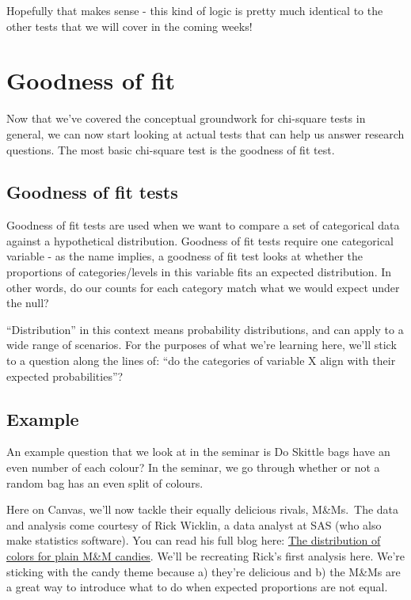 \documentclass[
]{book}
\begin{document}
Hopefully that makes sense - this kind of logic is pretty much identical to the other tests that we will cover in the coming weeks!

\hypertarget{goodness-of-fit}{%
\section{Goodness of fit}\label{goodness-of-fit}}

Now that we've covered the conceptual groundwork for chi-square tests in general, we can now start looking at actual tests that can help us answer research questions. The most basic chi-square test is the goodness of fit test.

\hypertarget{goodness-of-fit-tests}{%
\subsection{Goodness of fit tests}\label{goodness-of-fit-tests}}

Goodness of fit tests are used when we want to compare a set of categorical data against a hypothetical distribution. Goodness of fit tests require one categorical variable - as the name implies, a goodness of fit test looks at whether the proportions of categories/levels in this variable fits an expected distribution. In other words, do our counts for each category match what we would expect under the null?

``Distribution'' in this context means probability distributions, and can apply to a wide range of scenarios. For the purposes of what we're learning here, we'll stick to a question along the lines of: ``do the categories of variable X align with their expected probabilities''?

\hypertarget{example}{%
\subsection{Example}\label{example}}

An example question that we look at in the seminar is Do Skittle bags have an even number of each colour? In the seminar, we go through whether or not a random bag has an even split of colours.

Here on Canvas, we'll now tackle their equally delicious rivals, M\&Ms.~The data and analysis come courtesy of Rick Wicklin, a data analyst at SAS (who also make statistics software). You can read his full blog here: \href{https://blogs.sas.com/content/iml/2017/02/20/proportion-of-colors-mandms.html}{The distribution of colors for plain M\&M candies}. We'll be recreating Rick's first analysis here. We're sticking with the candy theme because a) they're delicious and b) the M\&Ms are a great way to introduce what to do when expected proportions are not equal.
\end{document}
